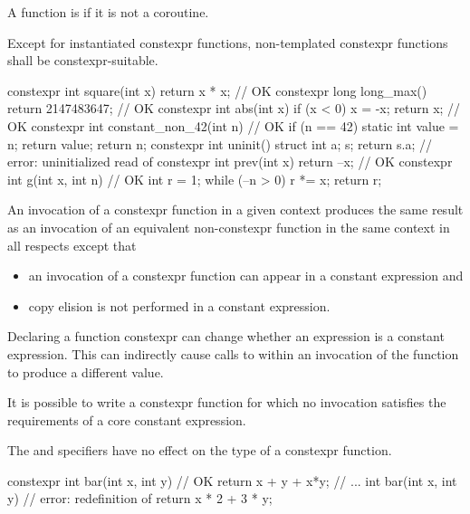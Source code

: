 \pnum
{}%
%
A function is  if
it is not a coroutine.

Except for instantiated constexpr functions,
non-templated constexpr functions shall be constexpr-suitable.

\begin{example}
\begin{codeblock}
constexpr int square(int x)
  { return x * x; }             // OK
constexpr long long_max()
  { return 2147483647; }        // OK
constexpr int abs(int x) {
  if (x < 0)
    x = -x;
  return x;                     // OK
}
constexpr int constant_non_42(int n) {  // OK
  if (n == 42) {
    static int value = n;
    return value;
  }
  return n;
}
constexpr int uninit() {
  struct { int a; } s;
  return s.a;                   // error: uninitialized read of 
}
constexpr int prev(int x)
  { return --x; }               // OK
constexpr int g(int x, int n) { // OK
  int r = 1;
  while (--n > 0) r *= x;
  return r;
}
\end{codeblock}
\end{example}

\pnum
An invocation of a constexpr function in a given context
produces the same result as
an invocation of an equivalent non-constexpr function in the same context
in all respects except that
\begin{itemize}
\item
an invocation of a constexpr function
can appear in a constant expression and
\item
copy elision is not performed in a constant expression.
\end{itemize}
\begin{note}
Declaring a function constexpr can change whether an expression
is a constant expression.
This can indirectly cause calls to 
within an invocation of the function to produce a different value.
\end{note}
\begin{note}
It is possible to write a constexpr function for which
no invocation satisfies the requirements of a core constant expression.
\end{note}

\pnum
The  and  specifiers have no
effect on the type of a constexpr function.
\begin{example}
\begin{codeblock}
constexpr int bar(int x, int y)         // OK
    { return x + y + x*y; }
// ...
int bar(int x, int y)                   // error: redefinition of 
    { return x * 2 + 3 * y; }
\end{codeblock}
\end{example}

